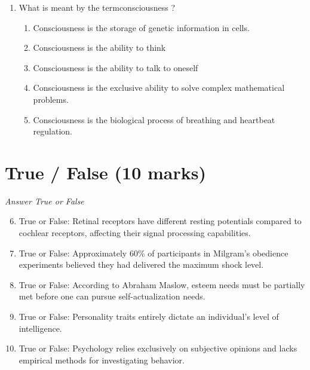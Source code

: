 \documentclass[12pt]{article}
\begin{document}
\begin{enumerate}[label=\arabic*.]
\begin{enumerate}[label=(\alph*)]
    \item Family members are dealing with the loss of a loved one.
    \item Family members attribute their problems to one of the members.
    \item The presenting problem involves sibling rivalry.
    \item The family has recently moved to a new city.
\end{enumerate}
\item What is meant by the termconsciousness ?
\begin{enumerate}[label=(\alph*)]
    \item Consciousness is the storage of genetic information in cells.
    \item Consciousness is the ability to think
    \item Consciousness is the ability to talk to oneself
    \item Consciousness is the exclusive ability to solve complex mathematical problems.
    \item Consciousness is the biological process of breathing and heartbeat regulation.
\end{enumerate}
\end{enumerate}

\section*{True / False (10 marks)}
\textit{Answer True or False}
\begin{enumerate}[label=\arabic*.]
\setcounter{enumi}{5}
\item True or False: Retinal receptors have different resting potentials compared to cochlear receptors, affecting their signal processing capabilities.
\item True or False: Approximately 60\% of participants in Milgram's obedience experiments believed they had delivered the maximum shock level.
\item True or False: According to Abraham Maslow, esteem needs must be partially met before one can pursue self-actualization needs.
\item True or False: Personality traits entirely dictate an individual's level of intelligence.
\item True or False: Psychology relies exclusively on subjective opinions and lacks empirical methods for investigating behavior.
\end{enumerate}
\end{document}
